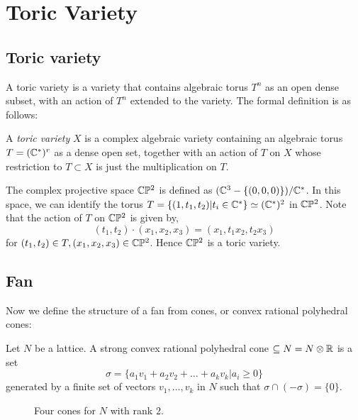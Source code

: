 \section{Toric Variety}
\label{sec:toric-variety}

\subsection{Toric variety}
\label{subsec:toric-variety}
    A toric variety is a variety that contains algebraic torus $T^n$ as an open dense subset,
    with an action of $T^n$ extended to the variety. 
    The formal definition is as follows:
    \begin{definition}
    \label{def:toric-variety}
	    A \emph{toric variety} $X$ is a complex algebraic variety 
	    containing an algebraic torus $T = (\mathbb{C}^\ast)^r$ as a dense open set,
 	    together with an action of $T$ on $X$ whose restriction to $T \subset X$ is just the multiplication on $T$. 
    \end{definition}

    \begin{example}
	    The complex projective space $\mathbb{C}\mathbb{P}^2$ is defined as $(\mathbb{C}^3 - \{(0,0,0)\})/\mathbb{C}^\ast$.
	    In this space, we can identify the torus $T = \{(1, t_1, t_2) | t_i \in \mathbb{C}^\ast\} \simeq (\mathbb{C}^\ast)^2$ in $\mathbb{C}\mathbb{P}^2$.
	    Note that the action of $T$ on $\mathbb{C}\mathbb{P}^2$ is given by, 
	    \[ (t_1, t_2) \cdot (x_1, x_2, x_3) = (x_1, t_1 x_2, t_2x_3)\]
	    for $(t_1, t_2) \in T, (x_1, x_2, x_3) \in \mathbb{C}\mathbb{P}^2$. 
	    Hence $\mathbb{C}\mathbb{P}^2$ is a toric variety.
    \end{example}


\subsection{Fan}
\label{subsec:fan}
    Now we define the structure of a fan from cones, or convex rational polyhedral cones:
    \begin{definition}
    \label{def:strong-convex-rational-polyhedral-cone}
	    Let $N$ be a lattice.
	    A strong convex rational polyhedral cone $\subseteq N = N \otimes \mathbb{R}$ 
	    is a set 
	    \[
	    \sigma = \{a_1 v_1 + a_2 v_2 + \ldots + a_k v_k | a_i \ge 0\}
	    \]
	    generated by a finite set of vectors $v_1, \ldots, v_k$ in $N$ such that $\sigma \cap (-\sigma) = \{0\}$.
    \end{definition}

    \begin{figure}
	\centering
    \caption{Four cones for $N$ with rank $2$.}
    \label{fig:example-cones}
    \end{figure}

